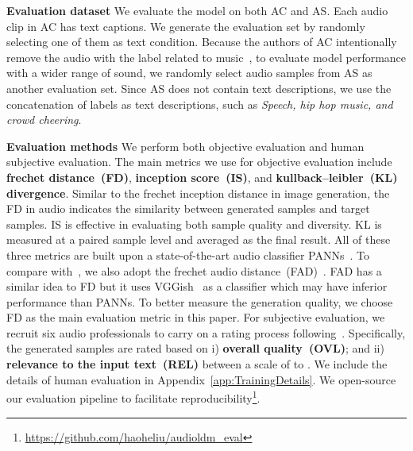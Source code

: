 \documentclass{article}
\begin{document}
\textbf{Evaluation dataset} We evaluate the model on both AC and AS. Each audio clip in AC has  text captions. We generate the evaluation set by randomly selecting one of them as text condition. Because the authors of AC intentionally remove the audio with the label related to music~\cite{kim2019audiocaps}, to evaluate model performance with a wider range of sound, we randomly select  audio samples from AS as another evaluation set. Since AS does not contain text descriptions, we use the concatenation of labels as text descriptions, such as \textit{Speech, hip hop music, and crowd cheering}. 





\textbf{Evaluation methods} We perform both objective evaluation and human subjective evaluation. The main metrics we use for objective evaluation include \textbf{frechet distance~(FD)}, \textbf{inception score~(IS)}, and \textbf{kullback–leibler~(KL) divergence}. Similar to the frechet inception distance in image generation, the FD in audio indicates the similarity between generated samples and target samples. IS is effective in evaluating both sample quality and diversity. KL is measured at a paired sample level and averaged as the final result. All of these three metrics are built upon a state-of-the-art audio classifier PANNs~\cite{kong2020panns}. To compare with~\cite{kreuk2022audiogen}, we also adopt the frechet audio distance~(FAD)~\cite{kilgour2019frechet}. FAD has a similar idea to FD but it uses VGGish~\cite{vggish_hershey2017cnn} as a classifier which may have inferior performance than PANNs. To better measure the generation quality, we choose FD as the main evaluation metric in this paper. For subjective evaluation, we recruit six audio professionals to carry on a rating process following~\cite{kreuk2022audiogen,yang2022diffsound}. Specifically, the generated samples are rated based on i) \textbf{overall quality~(OVL)}; and ii) \textbf{relevance to the input text~(REL)} between a scale of  to . We include the details of human evaluation in Appendix~\ref{app:TrainingDetails}. We open-source our evaluation pipeline to facilitate reproducibility\footnote{\url{https://github.com/haoheliu/audioldm_eval}}.
\end{document}
